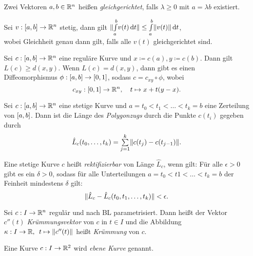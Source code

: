 \documentclass{cheat-sheet}
\newcommand{\Intabdt}[1]{\Int{a}{b}{#1}{t}}
\begin{document}
\begin{defn}
  Zwei Vektoren $a, b \in \mathbb{R}^n$ heißen \emph{gleichgerichtet}, falls $\lambda \geq 0$ mit $a = \lambda b$ existiert.
\end{defn}

\begin{satz}
  Sei $v : \left[ a, b \right] \to \mathbb{R}^n$ stetig, dann gilt $\norm{\Intabdt{v(t)}} \leq \Intabdt{\norm{v(t)}}$,\\
  wobei Gleichheit genau dann gilt, falls alle $v(t)$ gleichgerichtet sind.
\end{satz}

\begin{satz}
  Sei $c : \left[ a, b \right] \to \mathbb{R}^n$ eine reguläre Kurve und $x \coloneqq c(a), y \coloneqq c(b)$. Dann gilt $L(c) \geq d(x, y)$. Wenn $L(c) = d(x, y)$, dann gibt es einen Diffeomorphismus $\phi : \left[ a, b \right] \to \left[ 0, 1 \right]$, sodass $c = c_{xy} \circ \phi$, wobei
  \[ c_{xy} : \left[ 0, 1 \right] \to \mathbb{R}^n, \quad t \mapsto x + t (y - x). \]
\end{satz}


\begin{defn}
  Sei $c : \left[ a, b \right] \to \mathbb{R}^n$ eine stetige Kurve und $a = t_0 < t_1 < \ldots < t_k = b$ eine Zerteilung von $\left[ a, b \right]$. Dann ist die Länge des \emph{Polygonzugs} durch die Punkte $c(t_i)$ gegeben durch
  \[ \hat{L}_c(t_0, \ldots, t_k) = \sum_{j=1}^k \norm{c(t_j) - c(t_{j-1})}. \]
\end{defn}

\begin{defn}
  Eine stetige Kurve $c$ heißt \emph{rektifizierbar} von Länge $\hat{L}_c$, wenn gilt: Für alle $\epsilon > 0$ gibt es ein $\delta > 0$, sodass für alle Unterteilungen $a = t_0 < t1 < \ldots < t_k = b$ der Feinheit mindestens $\delta$ gilt:
  \[ \lVert\hat{L}_c - \hat{L}_c(t_0, t_1, \ldots, t_k)\rVert < \epsilon. \]
\end{defn}


\begin{defn}
  Sei $c : I \to \mathbb{R}^n$ regulär und nach BL parametrisiert. Dann heißt der Vektor $c''(t)$ \emph{Krümmungsvektor} von $c$ in $t \in I$ und die Abbildung $\kappa : I \to \mathbb{R}, \enspace t \mapsto \lVert c''(t)\rVert$ heißt \emph{Krümmung} von $c$. %
\end{defn}

\begin{defn}
  Eine Kurve $c : I \to \mathbb{R}^2$ wird \emph{ebene Kurve} genannt.
\end{defn}
\end{document}
